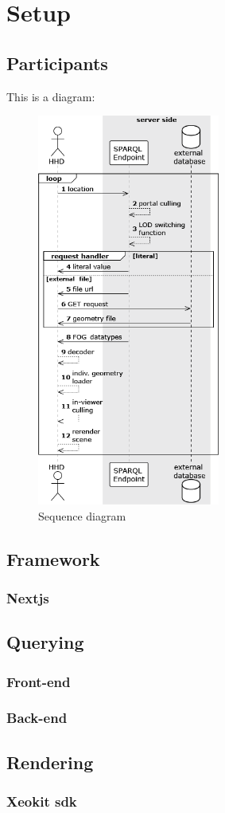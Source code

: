 \chapter{Setup}
    \section{Participants}
    This is a diagram:
    \begin{figure}[h]
        \centering
        \includegraphics[width=6cm]{./figures/sequenceDiagram.png}
        \caption{Sequence diagram}
        \label{fig:sequendeDiagram}
      \end{figure}
    \section{Framework}
        \subsection{Nextjs}
    \section{Querying}
        \subsection{Front-end}
        \subsection{Back-end}
    \section{Rendering}
        \subsection{Xeokit \acs{sdk}}